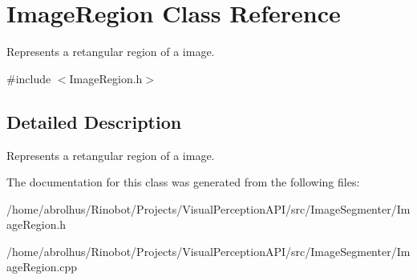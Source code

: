\hypertarget{class_image_region}{}\section{Image\+Region Class Reference}
\label{class_image_region}


Represents a retangular region of a image.  




{\ttfamily \#include $<$Image\+Region.\+h$>$}



\subsection{Detailed Description}
Represents a retangular region of a image. 

The documentation for this class was generated from the following files\+:\begin{DoxyCompactItemize}
\item 
/home/abrolhus/\+Rinobot/\+Projects/\+Visual\+Perception\+A\+P\+I/src/\+Image\+Segmenter/Image\+Region.\+h\item 
/home/abrolhus/\+Rinobot/\+Projects/\+Visual\+Perception\+A\+P\+I/src/\+Image\+Segmenter/Image\+Region.\+cpp\end{DoxyCompactItemize}
